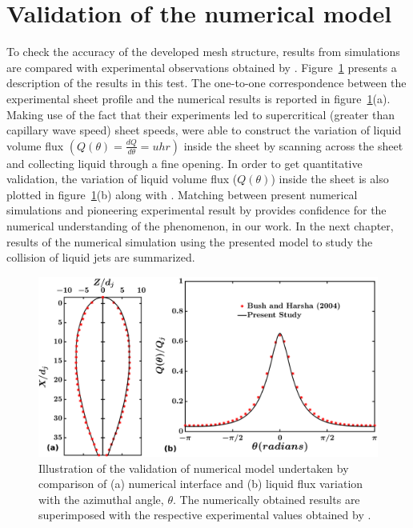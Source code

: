 \section{Validation of the numerical model}
To check the accuracy of the developed mesh structure, results from simulations are compared with experimental observations obtained by \cite{bush2004collision}. Figure~\ref{Figure::validation} presents a description of the results in this test. The one-to-one correspondence between the experimental sheet profile \citep{bush2004collision} and the numerical results is reported in figure~\ref{Figure::validation}(a). Making use of the fact that their experiments led to supercritical (greater than capillary wave speed) sheet speeds, \cite{bush2004collision} were able to construct the variation of liquid volume flux $\left(Q(\theta) = \frac{dQ}{d\theta} = uhr\right)$ inside the sheet by scanning across the sheet and collecting liquid through a fine opening. In order to get quantitative validation, the variation of liquid volume flux ($Q(\theta)$) inside the sheet is also plotted in figure~\ref{Figure::validation}(b) along with \cite{bush2004collision}. Matching between present numerical simulations and pioneering experimental result by \cite{bush2004collision} provides confidence for the numerical understanding of the phenomenon, in our work. In the next chapter, results of the numerical simulation using the presented model to study the collision of liquid jets are summarized.
\begin{figure}
	\centering
	\includegraphics[width=\linewidth]{chapters/Figure3}
	\caption{Illustration of the validation of numerical model undertaken by comparison of (a) numerical interface and (b) liquid flux variation with the azimuthal angle, $\theta$. The numerically obtained results are superimposed with the respective experimental values obtained by \cite{bush2004collision}.}
	\label{Figure::validation}
\end{figure}